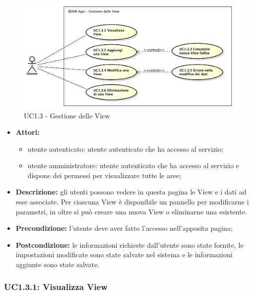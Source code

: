 \begin{figure}[!htbp]
    \centering
    \centerline{\includegraphics[scale=0.45]{./images/UC1_3.pdf}}
    \caption{UC1.3 - Gestione delle View}
\end{figure}

\begin{itemize}
    \item \textbf{Attori:}
    \begin{itemize}
    	\item utente autenticato: utente autenticato che ha accesso al servizio;
    	\item utente amministratore: utente autenticato che ha accesso al servizio e dispone dei permessi per visualizzare tutte le aree;
	\end{itemize}
	 \item \textbf{Descrizione:} gli utenti possono vedere in questa pagina le View e i dati ad esse associate. Per ciascuna View è disponibile un pannello per modificarne i parametri, in oltre si può creare una nuova View o eliminarne una esistente.

    \item \textbf{Precondizione:} l'utente deve aver fatto l'accesso nell'apposita pagina;
    \item \textbf{Postcondizione:} le informazioni richieste dall'utente sono state fornite, le impostazioni modificate sono state salvate nel sistema e le informazioni aggiunte sono state salvate.

\end{itemize}

\subsubsection{UC1.3.1: Visualizza View}

